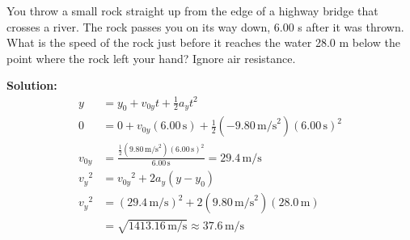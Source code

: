 \documentclass[12pt]{article}
\newenvironment{problem}[2][]{
    \begin{trivlist}
        \item[
            {\bfseries #1}
            {\bfseries #2}
        ]
}{\end{trivlist}}
\newcommand{\solution}{\medskip\noindent\textbf{Solution:}}
\newcommand{\unit}[1]{\, \text{#1}}
\newcommand{\m}{\unit{m}}
\newcommand{\mps}{\unit{m/s}}
\newcommand{\s}{\unit{s}}
\begin{document}
\begin{problem}{2.49}
    You throw a small rock straight up from the edge of a highway bridge that crosses a river.
    The rock passes you on its way down, 6.00 s after it was thrown.
    What is the speed of the rock just before it reaches the water 28.0 m below the point where the rock left your hand?
    Ignore air resistance.

    \solution
    \begin{align}
        y &= y_0 + v_{0y} t + \frac{1}{2} a_y t^2 \\
        0 &= 0 + v_{0y} \left(6.00 \s\right) + \frac{1}{2} \left(-9.80 \mps^2\right) \left(6.00 \s\right)^2 \\
        v_{0y} &= \frac{\frac{1}{2} \left(9.80 \mps^2\right) \left(6.00 \s\right)^2}{6.00 \s} = 29.4 \mps \\
        {v_y}^2 &= {v_{0y}}^2 + 2a_y \left(y - y_0\right) \\
        {v_y}^2 &= \left(29.4 \mps\right)^2 + 2 \left(9.80 \mps^2\right) \left(28.0 \m\right) \\
        &= \sqrt{1413.16 \mps} \approx 37.6 \mps
    \end{align}
\end{problem}
\end{document}
